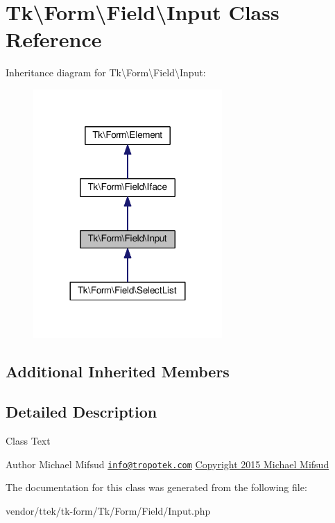 \hypertarget{classTk_1_1Form_1_1Field_1_1Input}{\section{Tk\textbackslash{}Form\textbackslash{}Field\textbackslash{}Input Class Reference}
\label{classTk_1_1Form_1_1Field_1_1Input}
}


Inheritance diagram for Tk\textbackslash{}Form\textbackslash{}Field\textbackslash{}Input\+:\nopagebreak
\begin{figure}[H]
\begin{center}
\leavevmode
\includegraphics[width=204pt]{classTk_1_1Form_1_1Field_1_1Input__inherit__graph}
\end{center}
\end{figure}
\subsection*{Additional Inherited Members}


\subsection{Detailed Description}
Class Text

\begin{DoxyAuthor}{Author}
Michael Mifsud \href{mailto:info@tropotek.com}{\tt info@tropotek.\+com} \hyperlink{}{Copyright 2015 Michael Mifsud }
\end{DoxyAuthor}


The documentation for this class was generated from the following file\+:\begin{DoxyCompactItemize}
\item 
vendor/ttek/tk-\/form/\+Tk/\+Form/\+Field/Input.\+php\end{DoxyCompactItemize}
